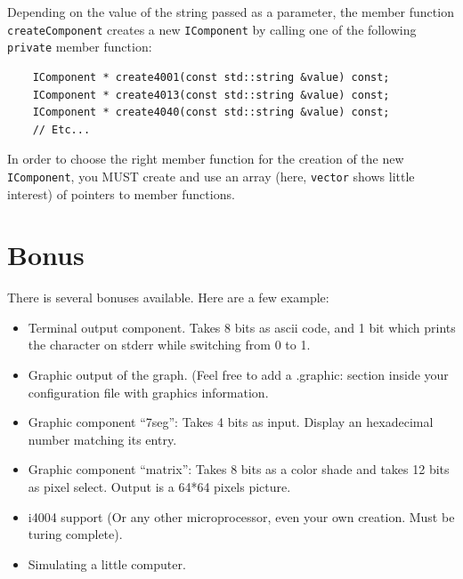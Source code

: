 \documentclass{koala-en}
\begin{document}
    Depending on the value of the string passed as a parameter, the member function
  \texttt{createComponent} creates a new \texttt{IComponent} by calling  one of the
  following \texttt{private} member function:

  \begin{lstlisting}
    IComponent * create4001(const std::string &value) const;
    IComponent * create4013(const std::string &value) const;
    IComponent * create4040(const std::string &value) const;
    // Etc...
  \end{lstlisting}

    In order to choose the right member function for the creation of the new
    \texttt{IComponent}, you MUST create and use an array (here, \texttt{vector}
    shows little interest) of pointers to member functions.

\chapter{Bonus}

There is several bonuses available. Here are a few example:

\begin{itemize}
    
  \item Terminal output component. Takes 8 bits as ascii code, and 1 bit
    which prints the character on stderr while switching from 0 to 1.

  \item Graphic output of the graph. (Feel free to add a .graphic: section
    inside your configuration file with graphics information.
    
  \item Graphic component ``7seg'':
    Takes 4 bits as input. Display an hexadecimal number matching its entry.
    
  \item Graphic component ``matrix'':
    Takes 8 bits as a color shade and takes 12 bits as pixel select.
    Output is a 64*64 pixels picture.
    
  \item i4004 support (Or any other microprocessor, even your own creation.
    Must be turing complete).

  \item Simulating a little computer.
    
\end{itemize}
\end{document}
